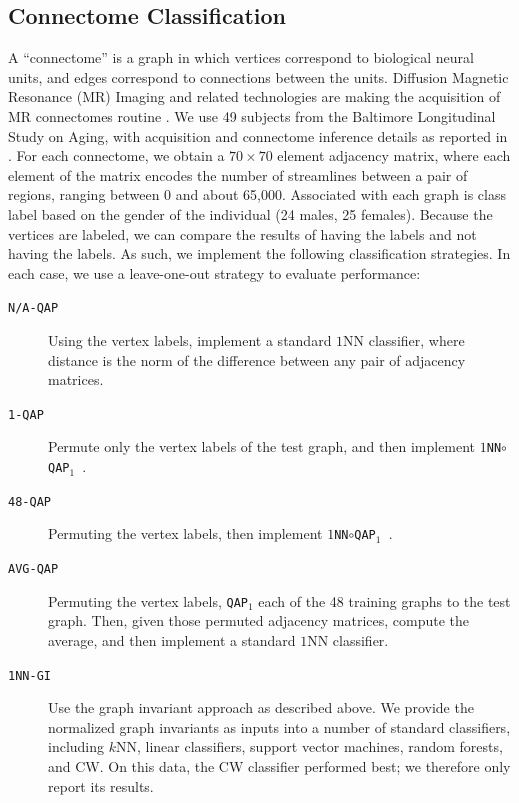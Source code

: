 \documentclass{article} %
\newcommand{\qapa}{\texttt{QAP}$_1$ }
\begin{document}
\clearpage
\subsection{Connectome Classification} %
\label{sub:connectome_classification}

A ``connectome'' is a graph in which vertices correspond to biological neural units, and edges correspond to connections between the units.  Diffusion Magnetic Resonance (MR) Imaging and related technologies are making the acquisition of MR connectomes routine \cite{Hagmann2010}.  We use 49 subjects from the Baltimore Longitudinal Study on Aging, with acquisition and connectome inference details as reported in \cite{OHBM10}.  For each connectome, we obtain a $70 \times 70$ element adjacency matrix, where each element of the matrix encodes the number of streamlines between a pair of regions, ranging between 0 and about 65,000.  Associated with each graph is class label based on the gender of the individual (24 males, 25 females).  Because the vertices are labeled, we can compare the results of having the labels and not having the labels.  As such, we implement the following classification strategies.  In each case, we use a leave-one-out strategy to evaluate performance:

\begin{description}
	\item[\texttt{N/A-QAP}] Using the vertex labels, implement a standard $1$NN classifier, where distance is the norm of the difference between any pair of adjacency matrices.
	\item[\texttt{1-QAP}] Permute only the vertex labels of the test graph, and then implement \texttt{$1$NN$\circ$\qapa}.
	\item[\texttt{48-QAP}] Permuting the vertex labels, then implement \texttt{$1$NN$\circ$\qapa}.
	\item[\texttt{AVG-QAP}] Permuting the vertex labels, \qapa each of the 48 training graphs to the test graph.  Then, given those permuted adjacency matrices, compute the average, and then implement a standard $1$NN classifier.
	\item[\texttt{1NN-GI}] Use the graph invariant approach as described above. We provide the normalized graph invariants as inputs into a number of standard classifiers, including $k$NN, linear classifiers, support vector machines, random forests, and CW. On this data, the CW classifier performed best; we therefore only report its results.
\end{description}
\end{document}
